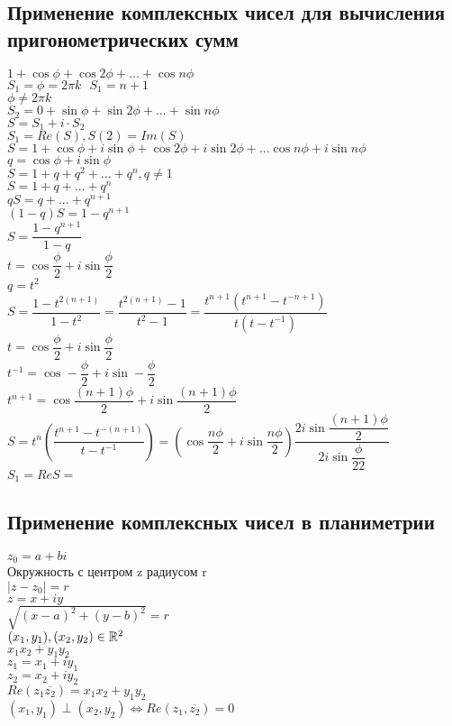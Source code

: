 \subsection{Применение комплексных чисел для вычисления пригонометрических сумм} 

$ 1 + \cos \phi + \cos 2\phi + ... + \cos n \phi $ \\
$ S_1 = \phi = 2 \pi k \ \ \ S_1 = n + 1 $ \\
$ \phi \neq 2 \pi k $ \\
$ S_2 = 0 + \sin \phi + \sin 2\phi + ... + \sin n \phi $ \\
$ S = S_1 + i \cdot S_2 $\\
$ S_1 = Re(S) , S(2) = Im(S) $ \\
$ S  = 1 + \cos \phi + i \sin \phi + \cos 2\phi +  i \sin 2\phi + ... \cos n \phi + i \sin n \phi $ \\
$ q = \cos \phi + i \sin \phi $ \\
$ S = 1 + q + q^2 + ... + q^n , q \neq 1 $\\
$ S = 1 + q + ... + q^n $ \\
$ qS = q + ... + q^{n+1} $ \\
$ (1-q) S = 1 - q^{n+1} $ \\
$ S = \dfrac{1 - q^{n+1}}{1 - q} $ \\
$ t = \cos \dfrac{\phi}{2} + i \sin \dfrac{\phi}{2} $ \\
$ q = t^2 $ \\
$ S = \dfrac{1- t^{2(n+1)}}{1-t^2} = \dfrac{t^{2(n+1)} - 1}{t^2 - 1} = \dfrac{t^{n+1} ( t^{n+1} - t^{-n+1} )}{t(t - t^{-1})} $ \\
$ t = \cos \dfrac{\phi}{2} + i \sin \dfrac{\phi}{2} $ \\
$ t^{-1} = \cos -\dfrac{\phi}{2} + i \sin -\dfrac{\phi}{2} $ \\
$ t^{n+1} = \cos \dfrac{(n+1)\phi}{2} + i \sin \dfrac{(n+1)\phi}{2} $ \\
$ S = t^n \left( \dfrac{t^{n+1} - t^{-(n+1)}}{t - t^{-1}} \right) = \left( \cos \dfrac{n\phi}{2} + i \sin \dfrac{n\phi}{2} \right) \dfrac{2i \sin \dfrac{(n+1) \phi }{2}}{2i \sin \dfrac{\phi}{22}} $\\
$ S_1 = ReS = $%
\subsection{Применение комплексных чисел в планиметрии} 
$ z_0 = a + bi $ \\
Окружность с центром z радиусом r \\
$ |z - z_0 | = r$ \\
$ z =  x + iy  $ \\
$ \sqrt{(x-a)^2 + (y-b)^2} = r$ \\
$ (x_1, y_1), (x_2, y_2) \in \mathbb{R}^2 $ \\
$ x_1x_2 + y_1y_2 $ \\
$ z_1 = x_1 + iy_1 $ \\
$ z_2 = x_2 + i y_2 $\\
$ Re(z_1 \overline{z_2}) = x_1x_2 + y_1y_2 $\\
$ (x_1, y_1) \perp (x_2, y_2) \Leftrightarrow Re(z_1, \overline{z_2}) = 0 $\\

